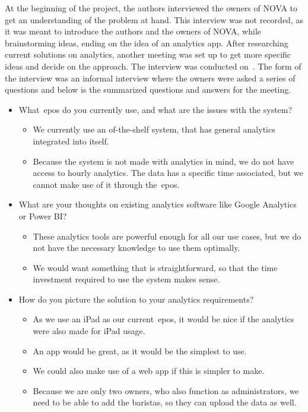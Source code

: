At the beginning of the project, the authors interviewed the owners of NOVA to get an understanding of the problem at
hand.
This interview was not recorded, as it was meant to introduce the authors and the owners of NOVA, while brainstorming
ideas, ending on the idea of an analytics app.
After researching current solutions on analytics, another meeting was set up to get more specific ideas and decide
on the approach.
The interview was conducted on~.
The form of the interview was an informal interview where the owners were asked a series of questions and below is
the summarized questions and answers for the meeting.

\begin{itemize}
    \item What~\acrshort{epos} do you currently use, and what are the issues with the system?
    \begin{itemize}
        \item We currently use an of-the-shelf system, that has general analytics integrated into itself.
        \item Because the system is not made with analytics in mind, we do not have access to hourly analytics.
        The data has a specific time associated, but we cannot make use of it through the~\acrshort{epos}.
    \end{itemize}

    \item What are your thoughts on existing analytics software like Google Analytics or Power BI\@?
    \begin{itemize}
        \item These analytics tools are powerful enough for all our use cases, but we do not have the necessary
        knowledge to use them optimally.
        \item We would want something that is straightforward, so that the time investment
        required to use the system makes sense.
    \end{itemize}

    \item How do you picture the solution to your analytics requirements?
    \begin{itemize}
        \item As we use an iPad as our current~\acrshort{epos}, it would be nice if the analytics were also made for
        iPad usage.
        \item An app would be great, as it would be the simplest to use.
        \item We could also make use of a web app if this is simpler to make.
        \item Because we are only two owners, who also function as administrators, we need to be able to add the
        baristas, so they can upload the data as well.
    \end{itemize}


\end{itemize}
